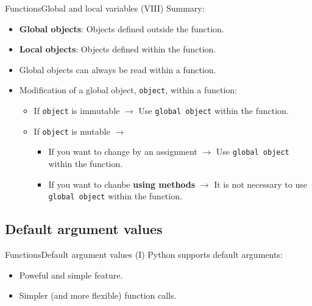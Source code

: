 \documentclass[10pt,compress]{beamer} %
\begin{document}
\begin{frame}{Functions}{Global and local variables (VIII)}
Summary:
\begin{itemize}
\item \textbf{Global objects}: Objects defined outside the function.
\item \textbf{Local objects}: Objects defined within the function.
\item \alert{Global objects} can always be read within a function.
\item Modification of a global object, \texttt{object}, within a function:
\begin{itemize}
\item If \texttt{object} \alert{is immutable} $\rightarrow$ Use \texttt{global object} within the function.
\item If \texttt{object} \alert{is mutable} $\rightarrow$
\begin{itemize}
\item If you want to change by an assignment $\rightarrow$ Use \texttt{global object} within the function.
\item If you want to chanbe \textbf{using methods} $\rightarrow$ It is not necessary to use \texttt{global object} within the function.
\end{itemize}
\end{itemize}
\end{itemize}
\end{frame}

\subsection{Default argument values}
\begin{frame}{Functions}{Default argument values (I)}
	Python supports default arguments:
		\begin{itemize}
		\item Poweful and simple feature.
		\item Simpler (and more flexible) function calls.
		\end{itemize}
		\vspace{-0.2cm}
    \begin{columns}
    \column{\textwidth}
		\begin{block}{}
		\vspace{-0.2cm}
		
		\vspace{-0.2cm}
		\end{block}
	\end{columns}
\end{frame}
\end{document}
